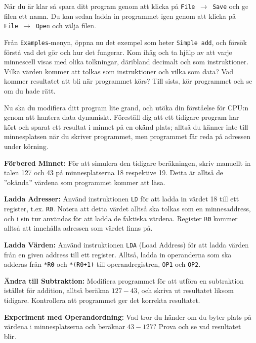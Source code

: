 \begin{Datorarbete}
    När du är klar så spara ditt program genom att klicka på \texttt{File}~$\rightarrow$~\texttt{Save} och ge filen ett namn. Du kan sedan ladda in programmet igen genom att klicka på \texttt{File}~$\rightarrow$~\texttt{Open} och välja filen.
    \vspace{-2mm}

    \item {} Från \texttt{Examples}-menyn, öppna nu det exempel som heter \texttt{Simple~add}, och försök förstå vad det gör och hur det fungerar. Kom ihåg och ta hjälp av att varje minnescell visas med olika tolkningar, däribland decimalt och som instruktioner. Vilka värden kommer att tolkas som instruktioner och vilka som data? Vad kommer resultatet att bli när programmet körs? Till sists, kör programmet och se om du hade rätt.

    \item {} Nu ska du modifiera ditt program lite grand, och utöka din förståelse för CPU:n genom att hantera data dynamiskt. Föreställ dig att ett tidigare program har kört och sparat ett resultat i minnet på en okänd plats; alltså du känner inte till minnesplatsen när du skriver programmet, men programmet får reda på adressen under körning.

    \begin{Deluppgifter}
        \item \textbf{Förbered Minnet:} För att simulera den tidigare beräkningen, skriv manuellt in talen 127 och 43 på minnesplatserna 18 respektive 19. Detta är alltså de ''okända'' värdena som programmet kommer att läsa.
        \item \textbf{Ladda Adresser:} Använd instruktionen \texttt{LD} för att ladda in värdet 18 till ett register, t.ex. \texttt{R0}. Notera att detta värdet alltså ska tolkas som en minnesaddress, och i sin tur användas för att ladda de faktiska värdena. Register \texttt{R0} kommer alltså att innehålla adressen som värdet finns på.
        \item \textbf{Ladda Värden:} Använd instruktionen \texttt{LDA} (Load Address) för att ladda värden från en given address till ett register. Alltså, ladda in operanderna som ska adderas från \texttt{*R0} och \texttt{*(R0+1)} till operandregistren, \texttt{OP1} och \texttt{OP2}.
        \item \textbf{Ändra till Subtraktion:} Modifiera programmet för att utföra en subtraktion istället för addition, alltså beräkna \(127-43\), och skriva ut resultatet liksom tidigare. Kontrollera att programmet ger det korrekta resultatet.
        \item \textbf{Experiment med Operandordning:} Vad tror du händer om du byter plats på värdena i minnesplatserna och beräknar \(43-127\)? Prova och se vad resultatet blir.
    \end{Deluppgifter}


\end{Datorarbete}
